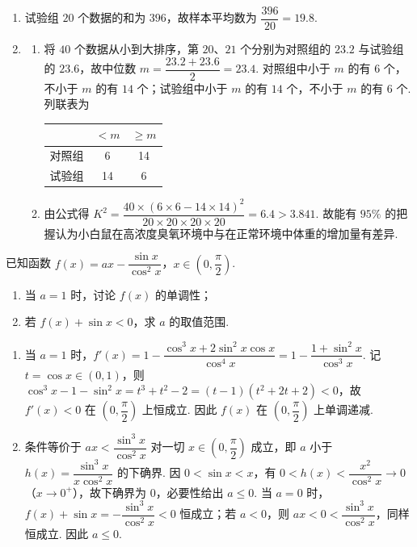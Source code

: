 \begin{solution}
\begin{enumerate}
\item 试验组 \(20\) 个数据的和为 \(396\)，故样本平均数为 \(\dfrac{396}{20}=19.8\).

\item
\begin{enumerate}
\item 将 \(40\) 个数据从小到大排序，第 \(20\)、\(21\) 个分别为对照组的 \(23.2\) 与试验组的 \(23.6\)，故中位数 \(m=\dfrac{23.2+23.6}{2}=23.4\). 对照组中小于 \(m\) 的有 \(6\) 个，不小于 \(m\) 的有 \(14\) 个；试验组中小于 \(m\) 的有 \(14\) 个，不小于 \(m\) 的有 \(6\) 个. 列联表为

\begin{center}
\begin{tabular}{c|cc}
 & \(<m\) & \(\ge m\) \\
\hline
对照组 & 6 & 14 \\
\hline
试验组 & 14 & 6 \\
\hline
\end{tabular}
\end{center}
\item 由公式得 \(K^2=\dfrac{40\times(6\times6-14\times14)^2}{20\times20\times20\times20}=6.4>3.841\). 故能有 \(95\%\) 的把握认为小白鼠在高浓度臭氧环境中与在正常环境中体重的增加量有差异.
\end{enumerate}
\end{enumerate}
\end{solution}

\begin{problem}
已知函数 \(f(x)=ax-\dfrac{\sin x}{\cos^2x}\)，\(x\in\left(0,\dfrac{\pi}{2}\right)\).
\begin{enumerate}
\item 当 \(a=1\) 时，讨论 \(f(x)\) 的单调性；
\item 若 \(f(x)+\sin x<0\)，求 \(a\) 的取值范围.
\end{enumerate}
\end{problem}

\begin{solution}
\begin{enumerate}
\item 当 \(a=1\) 时，\(f'(x)=1-\dfrac{\cos^3x+2\sin^2x\cos x}{\cos^4x}=1-\dfrac{1+\sin^2x}{\cos^3x}\). 记 \(t=\cos x\in(0,1)\)，则 \(\cos^3x-1-\sin^2x=t^3+t^2-2=(t-1)(t^2+2t+2)<0\)，故 \(f'(x)<0\) 在 \(\left(0,\dfrac{\pi}{2}\right)\) 上恒成立. 因此 \(f(x)\) 在 \(\left(0,\dfrac{\pi}{2}\right)\) 上单调递减.
\item 条件等价于 \(ax<\dfrac{\sin^3x}{\cos^2x}\) 对一切 \(x\in\left(0,\dfrac{\pi}{2}\right)\) 成立，即 \(a\) 小于 \(h(x)=\dfrac{\sin^3x}{x\cos^2x}\) 的下确界. 因 \(0<\sin x<x\)，有 \(0<h(x)<\dfrac{x^2}{\cos^2x}\to0\)（\(x\to0^+\)），故下确界为 \(0\)，必要性给出 \(a\leqslant0\). 当 \(a=0\) 时，\(f(x)+\sin x=-\dfrac{\sin^3x}{\cos^2x}<0\) 恒成立；若 \(a<0\)，则 \(ax<0<\dfrac{\sin^3x}{\cos^2x}\)，同样恒成立. 因此 \(a\leqslant0\).
\end{enumerate}
\end{solution}

